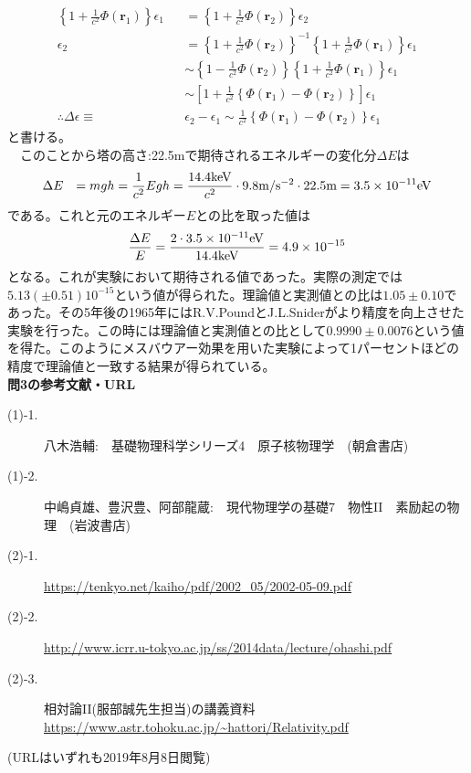 \documentclass[a4j,fleqn]{jsarticle}
\begin{document}
        \begin{eqnarray}
            \left\{1+\frac{1}{c^2}\Phi\left(\bm{r}_1\right)\right\}\epsilon_{1}&&=\left\{1+\frac{1}{c^2}\Phi\left(\bm{r}_2\right)\right\}\epsilon_{2}\\
            \epsilon_{2}&&=\left\{1+\frac{1}{c^2}\Phi\left(\bm{r}_2\right)\right\}^{-1}\left\{1+\frac{1}{c^2}\Phi\left(\bm{r}_1\right)\right\}\epsilon_{1}\\
            &&\sim\left\{1-\frac{1}{c^2}\Phi\left(\bm{r}_2\right)\right\}\left\{1+\frac{1}{c^2}\Phi\left(\bm{r}_1\right)\right\}\epsilon_{1}\\
            &&\sim\left[1+\frac{1}{c^2}\left\{\Phi\left(\bm{r}_1\right)-\Phi\left(\bm{r}_2\right)\right\}\right]\epsilon_1\\
            \therefore\Delta\epsilon\equiv&&\epsilon_2-\epsilon_1\sim\frac{1}{c^2}\left\{\Phi\left(\bm{r}_1\right)-\Phi\left(\bm{r}_2\right)\right\}\epsilon_1
        \end{eqnarray}
        と書ける。\\
        　このことから塔の高さ:22.5mで期待されるエネルギーの変化分$\Delta{E}$は
        \begin{eqnarray}
            \Delta{E}&&=mgh=\frac{1}{c^2}Egh=\frac{14.4{\rm{keV}}}{c^2}\cdot9.8{\rm{m/s^{-2}}}\cdot22.5{\rm{m}}=3.5\times10^{-11}{\rm{eV}}
        \end{eqnarray}
        である。これと元のエネルギー$E$との比を取った値は
        \begin{eqnarray}
            \frac{\Delta{E}}{E}=\frac{2\cdot3.5\times10^{-11}{\rm{eV}}}{14.4{\rm{keV}}}=4.9\times10^{-15}
        \end{eqnarray}
        となる。これが実験において期待される値であった。実際の測定では$5.13\left(\pm0.51\right)10^{-15}$という値が得られた。理論値と実測値との比は$1.05\pm0.10$であった。その5年後の1965年にはR.V.PoundとJ.L.Sniderがより精度を向上させた実験を行った。この時には理論値と実測値との比として$0.9990\pm0.0076$という値を得た。このようにメスバウアー効果を用いた実験によって1パーセントほどの精度で理論値と一致する結果が得られている。\\
        \newpage
        \textbf{問3の参考文献・URL}
        \begin{description}
            \item[(1)-1.]八木浩輔:　基礎物理科学シリーズ4　原子核物理学　(朝倉書店)
            \item[(1)-2.]中嶋貞雄、豊沢豊、阿部龍蔵:　現代物理学の基礎7　物性II　素励起の物理　(岩波書店)
            \item[(2)-1.]\url{https://tenkyo.net/kaiho/pdf/2002_05/2002-05-09.pdf}
            \item[(2)-2.]\url{http://www.icrr.u-tokyo.ac.jp/ss/2014data/lecture/ohashi.pdf}
            \item[(2)-3.] 相対論II(服部誠先生担当)の講義資料\\\url{https://www.astr.tohoku.ac.jp/~hattori/Relativity.pdf}
        \end{description}
        (URLはいずれも2019年8月8日閲覧)
        \newpage
\end{document}
